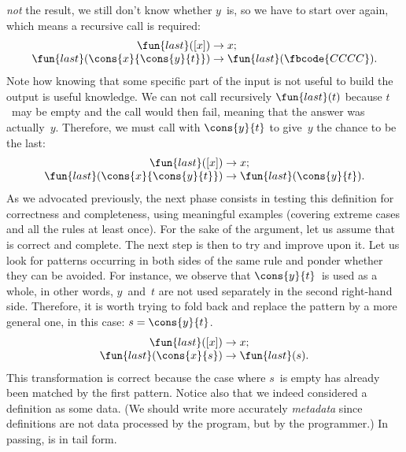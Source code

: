 \emph{not} the result, we still don't know whether \(y\)~is, so we
have to start over again, which means a recursive call is required:
\begin{equation*}
\begin{array}{r@{\;}c@{\;}l}
\fun{last}([x]) & \rightarrow & x;\\
\fun{last}(\cons{x}{\cons{y}{t}}) & \rightarrow &
\fun{last}(\fbcode{CCCC}).
\end{array}
\end{equation*}
Note how knowing that some specific part of the input is not useful to
build the output is useful knowledge. We can not call recursively
\(\fun{last}(t)\) because \(t\)~may be empty and the call would then
fail, meaning that the answer was actually~\(y\). Therefore, we must
call with \(\cons{y}{t}\) to give~\(y\) the chance to be the last:
\begin{equation*}
\begin{array}{r@{\;}c@{\;}l}
\fun{last}([x]) & \rightarrow & x;\\
\fun{last}(\cons{x}{\cons{y}{t}}) & \rightarrow &
\fun{last}(\cons{y}{t}).
\end{array}
\end{equation*}
As we advocated previously, the next phase consists in testing this
definition for correctness and completeness, using meaningful examples
(covering extreme cases and all the rules at least once). For the sake
of the argument, let us assume that  is correct and
complete. The next step is then to try and improve upon it. Let us
look for patterns occurring in both sides of the same rule and ponder
whether they can be avoided. For instance, we observe that
\(\cons{y}{t}\)~is used as a whole, in other words, \(y\)~and~\(t\)
are not used separately in the second right\hyp{}hand side. Therefore,
it is worth trying to fold back and replace the pattern by a more
general one, in this case: \(s = \cons{y}{t}\).
\begin{equation*}
\begin{array}{r@{\;}c@{\;}l}
\fun{last}([x]) & \rightarrow & x;\\
\fun{last}(\cons{x}{s}) & \rightarrow & \fun{last}(s).
\end{array}
\end{equation*}
This transformation is correct because the case where \(s\)~is empty
has already been matched by the first pattern. Notice also that we
indeed considered a definition as some data. (We should write more
accurately \emph{metadata} since definitions are not data processed by
the program, but by the programmer.) In passing,  is in
tail form.

